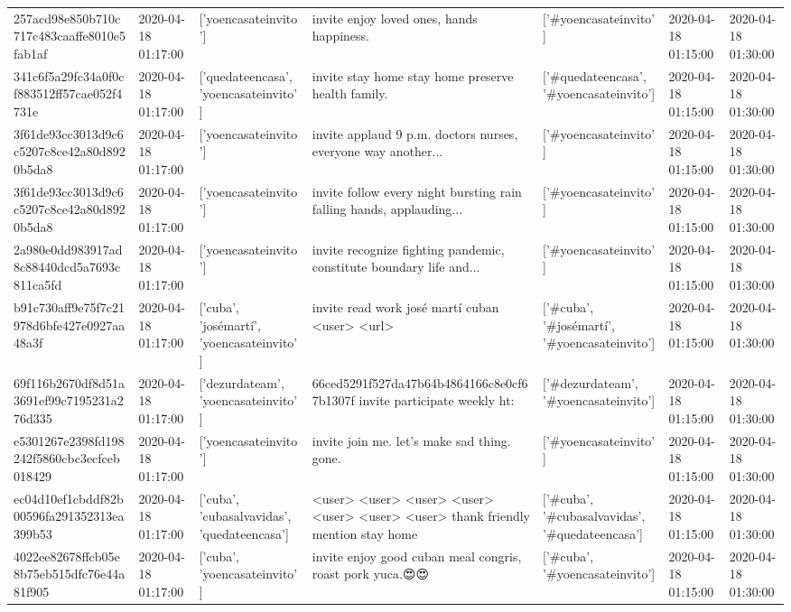 \begin{tabular}{lllllll}
257acd98e850b710c717c483caaffe8010e5fab1af & 2020-04-18 01:17:00 & ['yoencasateinvito'] & invite enjoy loved ones, hands happiness. & ['#yoencasateinvito'] & 2020-04-18 01:15:00 & 2020-04-18 01:30:00 \\
341c6f5a29fc34a0f0cf883512ff57cae052f4731e & 2020-04-18 01:17:00 & ['quedateencasa', 'yoencasateinvito'] & invite stay home stay home preserve health family. & ['#quedateencasa', '#yoencasateinvito'] & 2020-04-18 01:15:00 & 2020-04-18 01:30:00 \\
3f61de93cc3013d9c6c5207c8ce42a80d8920b5da8 & 2020-04-18 01:17:00 & ['yoencasateinvito'] & invite applaud 9 p.m. doctors nurses, everyone way another... & ['#yoencasateinvito'] & 2020-04-18 01:15:00 & 2020-04-18 01:30:00 \\
3f61de93cc3013d9c6c5207c8ce42a80d8920b5da8 & 2020-04-18 01:17:00 & ['yoencasateinvito'] & invite follow every night bursting rain falling hands, applauding... & ['#yoencasateinvito'] & 2020-04-18 01:15:00 & 2020-04-18 01:30:00 \\
2a980e0dd983917ad8c88440dcd5a7693c811ca5fd & 2020-04-18 01:17:00 & ['yoencasateinvito'] & invite recognize fighting pandemic, constitute boundary life and... & ['#yoencasateinvito'] & 2020-04-18 01:15:00 & 2020-04-18 01:30:00 \\
b91c730aff9e75f7c21978d6bfe427e0927aa48a3f & 2020-04-18 01:17:00 & ['cuba', 'josémartí', 'yoencasateinvito'] & invite read work josé martí cuban <user> <url> & ['#cuba', '#josémartí', '#yoencasateinvito'] & 2020-04-18 01:15:00 & 2020-04-18 01:30:00 \\
69f116b2670df8d51a3691ef99c7195231a276d335 & 2020-04-18 01:17:00 & ['dezurdateam', 'yoencasateinvito'] & 66ced5291f527da47b64b4864166c8e0cf67b1307f invite participate weekly ht: & ['#dezurdateam', '#yoencasateinvito'] & 2020-04-18 01:15:00 & 2020-04-18 01:30:00 \\
e5301267e2398fd198242f5860cbc3ecfceb018429 & 2020-04-18 01:17:00 & ['yoencasateinvito'] & invite join me. let's make sad thing. gone. & ['#yoencasateinvito'] & 2020-04-18 01:15:00 & 2020-04-18 01:30:00 \\
ec04d10ef1cbddf82b00596fa291352313ea399b53 & 2020-04-18 01:17:00 & ['cuba', 'cubasalvavidas', 'quedateencasa'] & <user> <user> <user> <user> <user> <user> <user> thank friendly mention stay home & ['#cuba', '#cubasalvavidas', '#quedateencasa'] & 2020-04-18 01:15:00 & 2020-04-18 01:30:00 \\
4022ee82678ffcb05e8b75eb515dfc76e44a81f905 & 2020-04-18 01:17:00 & ['cuba', 'yoencasateinvito'] & invite enjoy good cuban meal congris, roast pork yuca.😍😍 & ['#cuba', '#yoencasateinvito'] & 2020-04-18 01:15:00 & 2020-04-18 01:30:00 \\

\end{tabular}
